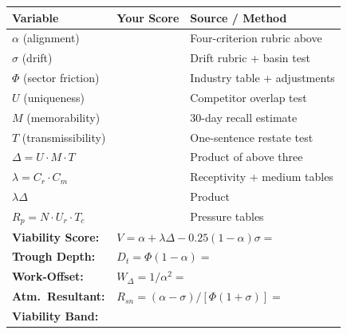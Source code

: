\documentclass[12pt, openany]{book}
\theoremstyle{thmstyle}
\theoremstyle{defstyle}
\begin{document}
\begin{center}
\begin{tabular}{p{2.5in}p{1.0in}p{2.0in}}
\toprule
\textbf{Variable} & \textbf{Your Score} & \textbf{Source / Method} \\
\midrule
$\alpha$ (alignment) & \underline{\hspace{0.8in}} & Four-criterion rubric above \\
$\sigma$ (drift) & \underline{\hspace{0.8in}} & Drift rubric + basin test \\
$\Phi$ (sector friction) & \underline{\hspace{0.8in}} & Industry table + adjustments \\
$U$ (uniqueness) & \underline{\hspace{0.8in}} & Competitor overlap test \\
$M$ (memorability) & \underline{\hspace{0.8in}} & 30-day recall estimate \\
$T$ (transmissibility) & \underline{\hspace{0.8in}} & One-sentence restate test \\
$\Delta = U \cdot M \cdot T$ & \underline{\hspace{0.8in}} & Product of above three \\
$\lambda = C_r \cdot C_m$ & \underline{\hspace{0.8in}} & Receptivity + medium tables \\
$\lambda\Delta$ & \underline{\hspace{0.8in}} & Product \\
$R_p = N \cdot U_r \cdot T_c$ & \underline{\hspace{0.8in}} & Pressure tables \\
\midrule
\textbf{Viability Score:} & \multicolumn{2}{l}{$V = \alpha + \lambda\Delta - 0.25(1-\alpha)\sigma = $ \underline{\hspace{0.8in}}} \\
\textbf{Trough Depth:} & \multicolumn{2}{l}{$D_t = \Phi(1-\alpha) = $ \underline{\hspace{0.8in}}} \\
\textbf{Work-Offset:} & \multicolumn{2}{l}{$W_\Delta = 1/\alpha^2 = $ \underline{\hspace{0.8in}}} \\
\textbf{Atm.\ Resultant:} & \multicolumn{2}{l}{$R_{sn} = (\alpha - \sigma)/[\Phi(1+\sigma)] = $ \underline{\hspace{0.8in}}} \\
\textbf{Viability Band:} & \multicolumn{2}{l}{\underline{\hspace{2.2in}}} \\
\bottomrule
\end{tabular}
\end{center}
\end{document}
